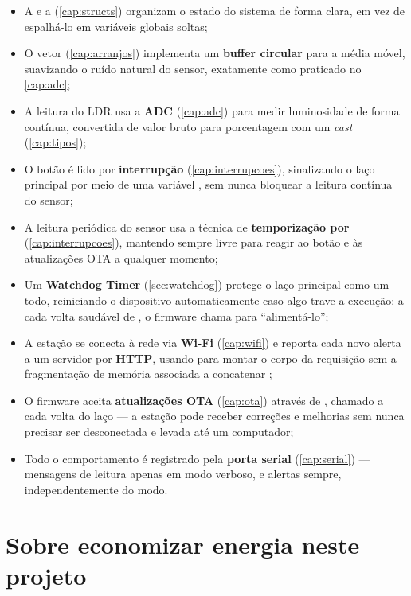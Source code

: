 \begin{itemize}
    \item A  e a  (\cref{cap:structs}) organizam o estado do sistema de forma clara, em vez de espalhá-lo em variáveis globais soltas;
    \item O vetor  (\cref{cap:arranjos}) implementa um \textbf{buffer circular} para a média móvel, suavizando o ruído natural do sensor, exatamente como praticado no \cref{cap:adc};
    \item A leitura do LDR usa a \textbf{ADC} (\cref{cap:adc}) para medir luminosidade de forma contínua, convertida de valor bruto para porcentagem com um \emph{cast} (\cref{cap:tipos});
    \item O botão é lido por \textbf{interrupção} (\cref{cap:interrupcoes}), sinalizando o laço principal por meio de uma variável , sem nunca bloquear a leitura contínua do sensor;
    \item A leitura periódica do sensor usa a técnica de \textbf{temporização por } (\cref{cap:interrupcoes}), mantendo  sempre livre para reagir ao botão e às atualizações OTA a qualquer momento;
    \item Um \textbf{Watchdog Timer} (\cref{sec:watchdog}) protege o laço principal como um todo, reiniciando o dispositivo automaticamente caso algo trave a execução: a cada volta saudável de , o firmware chama  para ``alimentá-lo'';
    \item A estação se conecta à rede via \textbf{Wi-Fi} (\cref{cap:wifi}) e reporta cada novo alerta a um servidor por \textbf{HTTP}, usando  para montar o corpo da requisição sem a fragmentação de memória associada a concatenar ;
    \item O firmware aceita \textbf{atualizações OTA} (\cref{cap:ota}) através de , chamado a cada volta do laço — a estação pode receber correções e melhorias sem nunca precisar ser desconectada e levada até um computador;
    \item Todo o comportamento é registrado pela \textbf{porta serial} (\cref{cap:serial}) — mensagens de leitura apenas em modo verboso, e alertas sempre, independentemente do modo.
\end{itemize}

\section{Sobre economizar energia neste projeto}

